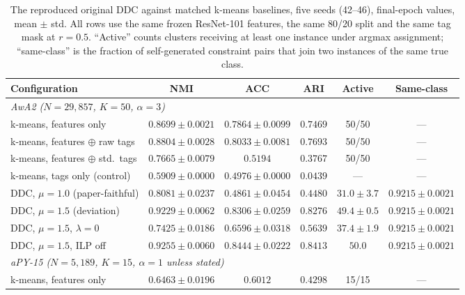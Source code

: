 \begin{table}[H]
    \centering
    \footnotesize
    \setlength{\tabcolsep}{4pt}
    \caption[Matched comparison of the reproduced original DDC against k-means baselines]{The reproduced original DDC against matched k-means baselines, five seeds (42--46), final-epoch values, mean $\pm$ std. All rows use the same frozen ResNet-101 features, the same 80/20 split and the same tag mask at $r = 0.5$. ``Active'' counts clusters receiving at least one instance under argmax assignment; ``same-class'' is the fraction of self-generated constraint pairs that join two instances of the same true class.}
    \label{tab:repro_matched}
    \begin{tabular}{lccccc}
        \hline
        \textbf{Configuration} & \textbf{NMI} & \textbf{ACC} & \textbf{ARI} & \textbf{Active} & \textbf{Same-class} \\
        \hline
        \multicolumn{6}{l}{\textit{AwA2 ($N = 29{,}857$, $K = 50$, $\alpha = 3$)}} \\
        k-means, features only & $0.8699 \pm 0.0021$ & $0.7864 \pm 0.0099$ & $0.7469$ & 50/50 & --- \\
        k-means, features $\oplus$ raw tags & $\mathbf{0.8804 \pm 0.0028}$ & $0.8033 \pm 0.0081$ & $0.7693$ & 50/50 & --- \\
        k-means, features $\oplus$ std.\ tags & $0.7665 \pm 0.0079$ & $0.5194$ & $0.3767$ & 50/50 & --- \\
        k-means, tags only (control) & $0.5909 \pm 0.0000$ & $0.4976 \pm 0.0000$ & $0.0439$ & --- & --- \\
        DDC, $\mu = 1.0$ (paper-faithful) & $0.8081 \pm 0.0237$ & $0.4861 \pm 0.0454$ & $0.4480$ & $31.0 \pm 3.7$ & $0.9215 \pm 0.0021$ \\
        DDC, $\mu = 1.5$ (deviation) & $0.9229 \pm 0.0062$ & $0.8306 \pm 0.0259$ & $0.8276$ & $49.4 \pm 0.5$ & $0.9215 \pm 0.0021$ \\
        DDC, $\mu = 1.5$, $\lambda = 0$ & $0.7425 \pm 0.0186$ & $0.6596 \pm 0.0318$ & $0.5639$ & $37.4 \pm 1.9$ & $0.9215 \pm 0.0021$ \\
        DDC, $\mu = 1.5$, ILP off & $0.9255 \pm 0.0060$ & $0.8444 \pm 0.0222$ & $0.8413$ & $50.0$ & $0.9215 \pm 0.0021$ \\
        \hline
        \multicolumn{6}{l}{\textit{aPY-15 ($N = 5{,}189$, $K = 15$, $\alpha = 1$ unless stated)}} \\
        k-means, features only & $0.6463 \pm 0.0196$ & $0.6012$ & $0.4298$ & 15/15 & --- \\

\end{tabular}
\end{table}
